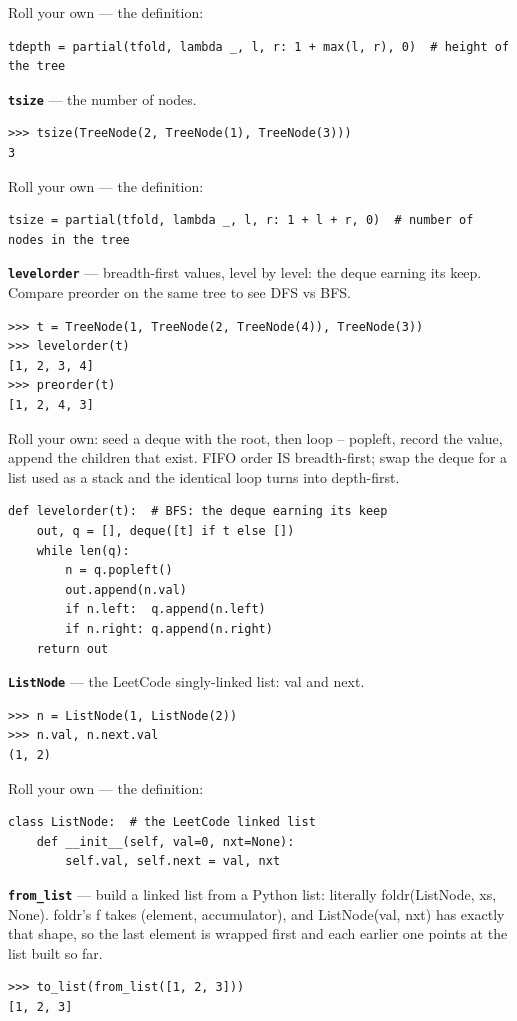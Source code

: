\documentclass[10pt,letterpaper]{article}
\begin{document}
Roll your own --- the definition:

\begin{lstlisting}[style=ex]
tdepth = partial(tfold, lambda _, l, r: 1 + max(l, r), 0)  # height of the tree
\end{lstlisting}
\textbf{\texttt{tsize}} --- the number of nodes.
\begin{lstlisting}[style=ex]
>>> tsize(TreeNode(2, TreeNode(1), TreeNode(3)))
3
\end{lstlisting}

Roll your own --- the definition:

\begin{lstlisting}[style=ex]
tsize = partial(tfold, lambda _, l, r: 1 + l + r, 0)  # number of nodes in the tree
\end{lstlisting}
\textbf{\texttt{levelorder}} --- breadth-first values, level by level: the deque earning its keep. Compare preorder on the same tree to see DFS vs BFS.
\begin{lstlisting}[style=ex]
>>> t = TreeNode(1, TreeNode(2, TreeNode(4)), TreeNode(3))
>>> levelorder(t)
[1, 2, 3, 4]
>>> preorder(t)
[1, 2, 4, 3]
\end{lstlisting}

Roll your own: seed a deque with the root, then loop -- popleft, record the value, append the children that exist. FIFO order IS breadth-first; swap the deque for a list used as a stack and the identical loop turns into depth-first.

\begin{lstlisting}[style=ex]
def levelorder(t):  # BFS: the deque earning its keep
    out, q = [], deque([t] if t else [])
    while len(q):
        n = q.popleft()
        out.append(n.val)
        if n.left:  q.append(n.left)
        if n.right: q.append(n.right)
    return out
\end{lstlisting}
\textbf{\texttt{ListNode}} --- the LeetCode singly-linked list: val and next.
\begin{lstlisting}[style=ex]
>>> n = ListNode(1, ListNode(2))
>>> n.val, n.next.val
(1, 2)
\end{lstlisting}

Roll your own --- the definition:

\begin{lstlisting}[style=ex]
class ListNode:  # the LeetCode linked list
    def __init__(self, val=0, nxt=None):
        self.val, self.next = val, nxt
\end{lstlisting}
\textbf{\texttt{from\_list}} --- build a linked list from a Python list: literally foldr(ListNode, xs, None). foldr's f takes (element, accumulator), and ListNode(val, nxt) has exactly that shape, so the last element is wrapped first and each earlier one points at the list built so far.
\begin{lstlisting}[style=ex]
>>> to_list(from_list([1, 2, 3]))
[1, 2, 3]
\end{lstlisting}
\end{document}
